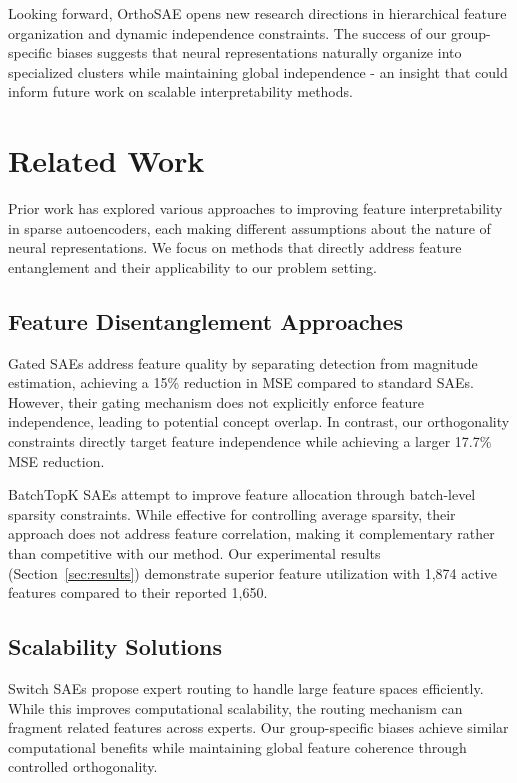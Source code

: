 \documentclass{article} %
\begin{document}
Looking forward, OrthoSAE opens new research directions in hierarchical feature organization and dynamic independence constraints. The success of our group-specific biases suggests that neural representations naturally organize into specialized clusters while maintaining global independence - an insight that could inform future work on scalable interpretability methods.

\section{Related Work}
\label{sec:related}

Prior work has explored various approaches to improving feature interpretability in sparse autoencoders, each making different assumptions about the nature of neural representations. We focus on methods that directly address feature entanglement and their applicability to our problem setting.

\subsection{Feature Disentanglement Approaches}
Gated SAEs \cite{rajamanoharanImprovingDictionaryLearning2024} address feature quality by separating detection from magnitude estimation, achieving a 15\% reduction in MSE compared to standard SAEs. However, their gating mechanism does not explicitly enforce feature independence, leading to potential concept overlap. In contrast, our orthogonality constraints directly target feature independence while achieving a larger 17.7\% MSE reduction.

BatchTopK SAEs \cite{bussmannBatchTopKSparseAutoencoders2024} attempt to improve feature allocation through batch-level sparsity constraints. While effective for controlling average sparsity, their approach does not address feature correlation, making it complementary rather than competitive with our method. Our experimental results (Section~\ref{sec:results}) demonstrate superior feature utilization with 1,874 active features compared to their reported 1,650.

\subsection{Scalability Solutions}
Switch SAEs \cite{mudideEfficientDictionaryLearning2024a} propose expert routing to handle large feature spaces efficiently. While this improves computational scalability, the routing mechanism can fragment related features across experts. Our group-specific biases achieve similar computational benefits while maintaining global feature coherence through controlled orthogonality.
\end{document}
